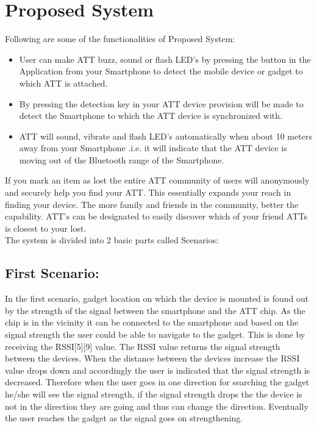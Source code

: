 \documentclass[a4paper,10pt]{report}
\begin{document}
\chapter{Proposed System}
Following are some of the functionalities of Proposed System:
\begin{itemize}
 \item User can make ATT buzz, sound or flash LED’s by pressing the button in the Application from your Smartphone to detect the mobile device or gadget to which ATT is attached.
 \item By pressing the detection key in your ATT device provision will be made to detect the Smartphone to which the ATT device is synchronized with.
 \item ATT will sound, vibrate and flash LED’s automatically when about 10 meters away from your Smartphone .i.e. it will indicate that the ATT device is moving out of the Bluetooth range of the Smartphone.
\end{itemize}
If you mark an item as lost the entire ATT community of users will anonymously and securely help you find your ATT. This essentially expands your reach in finding your device. The more family and friends in the community, better the capability. ATT’s can be designated to easily discover which of your friend ATTs is closest to your lost.\\
\newpage
The system is divided into 2 basic parts called Scenarios:
\section{First Scenario:}
In the first scenario, gadget location on which the device is mounted is found out by the strength of the signal between the smartphone and the ATT chip. As the chip is in the vicinity it can be connected to the smartphone and based on the signal strength the user could be able to navigate to the gadget. This is done by receiving the RSSI[5][9] value. The RSSI value returns the signal strength between the devices. When the distance between the devices increase the RSSI value drops down and accordingly the user is indicated that the signal strength is decreased. Therefore when the user goes in one direction for searching the gadget he/she will see the signal strength, if the signal strength drops the the device is not in the direction they are going and thus can change the direction. Eventually the user reaches the gadget as the signal goes on strengthening.
\newpage
\end{document}
